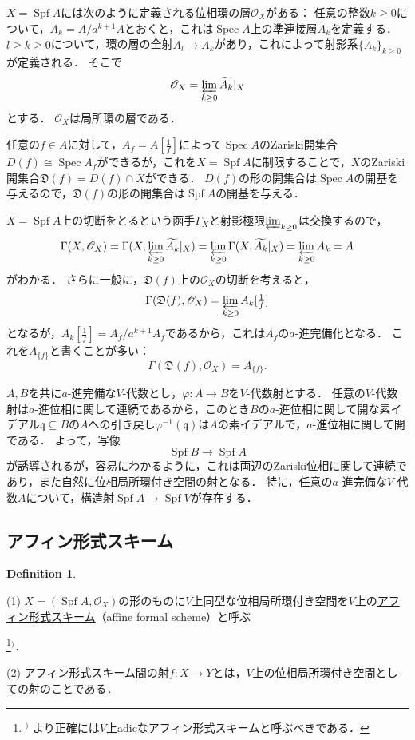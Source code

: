 \documentclass[a4paper,12pt, dvipdfmx]{jsbook}
\def\O{\mathscr{O}}
\def\til#1{\widetilde{#1}}%
\def\Spec{\mathop{\mathrm{Spec}}\nolimits}
\def\Spf{\mathop{\mathrm{Spf}}\nolimits}
\theoremstyle{plain}
\theoremstyle{definition}
\newtheorem{dfn}[thm]{\bfseries Definition}
\newcounter{chushaku}
\def\chu#1{\addtocounter{chushaku}{1}\footnote[\value{chushaku}]{${}^)$ #1}${}^)$}
\begin{document}
$X=\Spf A$には次のように定義される位相環の層$\O_X$がある：
任意の整数$k\geq 0$について，$A_k=A/a^{k+1}A$とおくと，これは$\Spec A$上の準連接層$\til{A_k}$を定義する．
$l\geq k\geq 0$について，環の層の全射$\til{A_l}\rightarrow\til{A_k}$があり，これによって射影系$\{\til{A_k}\}_{k\geq 0}$が定義される．
そこで
$$
\O_X=\varprojlim_{k\geq 0}\til{A_k}|_X
$$
とする．
$\O_X$は局所環の層である．

任意の$f\in A$に対して，$A_f=A[\frac{1}{f}]$によって$\Spec A$のZariski開集合$D(f)\cong\Spec A_f$ができるが，これを$X=\Spf A$に制限することで，$X$のZariski開集合$\mathfrak{D}(f)=D(f)\cap X$ができる．
$D(f)$の形の開集合は$\Spec A$の開基を与えるので，$\mathfrak{D}(f)$の形の開集合は$\Spf A$の開基を与える．

$X=\Spf A$上の切断をとるという函手$\Gamma_X$と射影極限$\varprojlim_{k\geq 0}$は交換するので，
$$
\Gamma(X,\O_X)=\Gamma(X,\varprojlim_{k\geq 0}\til{A_k}|_X)=\varprojlim_{k\geq 0}\Gamma(X,\til{A_k}|_X)=\varprojlim_{k\geq 0}A_k=A
$$
がわかる．
さらに一般に，$\mathfrak{D}(f)$上の$\O_X$の切断を考えると，
$$
\Gamma(\mathfrak{D}(f),\O_X)=\varprojlim_{k\geq 0}A_k[{\textstyle \frac{1}{f}}]
$$
となるが，$A_k[\frac{1}{f}]=A_f/a^{k+1}A_f$であるから，これは$A_f$の$a$-進完備化となる．
これを$A_{\{f\}}$と書くことが多い：
$$
\Gamma(\mathfrak{D}(f),\O_X)=A_{\{f\}}.
$$

$A,B$を共に$a$-進完備な$V$-代数とし，$\varphi\colon A\rightarrow B$を$V$-代数射とする．
任意の$V$-代数射は$a$-進位相に関して連続であるから，このとき$B$の$a$-進位相に関して開な素イデアル$\mathfrak{q}\subseteq B$の$A$への引き戻し$\varphi^{-1}(\mathfrak{q})$は$A$の素イデアルで，$a$-進位相に関して開である．
よって，写像
$$
\Spf B\longrightarrow\Spf A
$$
が誘導されるが，容易にわかるように，これは両辺のZariski位相に関して連続であり，また自然に位相局所環付き空間の射となる．
特に，任意の$a$-進完備な$V$-代数$A$について，構造射$\Spf A\rightarrow\Spf V$が存在する．

\subsection{アフィン形式スキーム}\label{sub-affineformalschemes}
\begin{dfn}\label{dfn-affineformalschemes}{\rm 
(1) $X=(\Spf A,\O_X)$の形のものに$V$上同型な位相局所環付き空間を$V$上の\underline{アフィン形式スキーム}（affine formal scheme）と呼ぶ\chu{より正確には$V$上adicなアフィン形式スキームと呼ぶべきである．}．

(2) アフィン形式スキーム間の射$f\colon X\rightarrow Y$とは，$V$上の位相局所環付き空間としての射のことである．}
\end{dfn}
\end{document}
